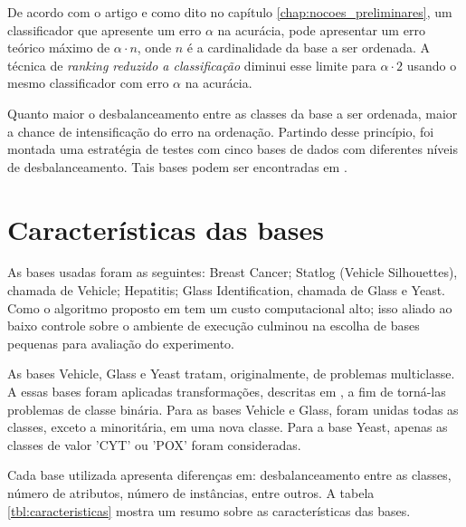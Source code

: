 De acordo com o artigo \cite{langford08} e como dito no capítulo \ref{chap:nocoes_preliminares}, um classificador que apresente um erro $\alpha$ na acurácia, pode apresentar um erro teórico máximo de $\alpha \cdot n$, onde $n$ é a cardinalidade da base a ser ordenada. A técnica de \emph{ranking reduzido a classificação} diminui esse limite para $\alpha \cdot 2$ usando o mesmo classificador com erro $\alpha$ na acurácia.

Quanto maior o desbalanceamento entre as classes da base a ser ordenada, maior a chance de intensificação do erro na ordenação. Partindo desse princípio, foi montada uma estratégia de testes com cinco bases de dados com diferentes níveis de desbalanceamento. Tais bases podem ser encontradas em \cite{ucimlr}.

\section{Características das bases}

As bases usadas foram as seguintes: Breast Cancer; Statlog (Vehicle Silhouettes), chamada de Vehicle; Hepatitis; Glass Identification, chamada de Glass e Yeast. Como o algoritmo proposto em \cite{langford08} tem um custo computacional alto; isso aliado ao baixo controle sobre o ambiente de execução culminou na escolha de bases pequenas para avaliação do experimento.

As bases Vehicle, Glass e Yeast tratam, originalmente, de problemas multiclasse. A essas bases foram aplicadas transformações, descritas em \cite{guo04}, a fim de torná-las problemas de classe binária. Para as bases Vehicle e Glass, foram unidas todas as classes, exceto a minoritária, em uma nova classe. Para a base Yeast, apenas as classes de valor 'CYT' ou 'POX' foram consideradas.

Cada base utilizada apresenta diferenças em: desbalanceamento entre as classes, número de atributos, número de instâncias, entre outros. A tabela \ref{tbl:caracteristicas} mostra um resumo sobre as características das bases.

